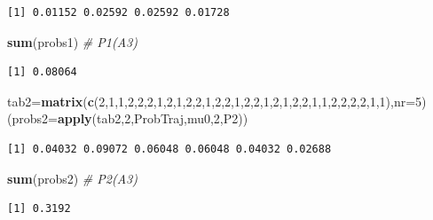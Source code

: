 \documentclass[
]{book}
\newenvironment{Shaded}{\begin{snugshade}}{\end{snugshade}}
\newcommand{\CommentTok}[1]{\textcolor[rgb]{0.56,0.35,0.01}{\textit{#1}}}
\newcommand{\DataTypeTok}[1]{\textcolor[rgb]{0.13,0.29,0.53}{#1}}
\newcommand{\DecValTok}[1]{\textcolor[rgb]{0.00,0.00,0.81}{#1}}
\newcommand{\KeywordTok}[1]{\textcolor[rgb]{0.13,0.29,0.53}{\textbf{#1}}}
\newcommand{\NormalTok}[1]{#1}
\theoremstyle{definition}
\theoremstyle{definition}
\theoremstyle{definition}
\theoremstyle{remark}
\begin{document}
\begin{verbatim}
[1] 0.01152 0.02592 0.02592 0.01728
\end{verbatim}

\begin{Shaded}
\begin{Highlighting}[]
\KeywordTok{sum}\NormalTok{(probs1)    }\CommentTok{# P1(A3)}
\end{Highlighting}
\end{Shaded}

\begin{verbatim}
[1] 0.08064
\end{verbatim}

\begin{Shaded}
\begin{Highlighting}[]
\NormalTok{tab2=}\KeywordTok{matrix}\NormalTok{(}\KeywordTok{c}\NormalTok{(}\DecValTok{2}\NormalTok{,}\DecValTok{1}\NormalTok{,}\DecValTok{1}\NormalTok{,}\DecValTok{2}\NormalTok{,}\DecValTok{2}\NormalTok{,}\DecValTok{2}\NormalTok{,}\DecValTok{1}\NormalTok{,}\DecValTok{2}\NormalTok{,}\DecValTok{1}\NormalTok{,}\DecValTok{2}\NormalTok{,}\DecValTok{2}\NormalTok{,}\DecValTok{1}\NormalTok{,}\DecValTok{2}\NormalTok{,}\DecValTok{2}\NormalTok{,}\DecValTok{1}\NormalTok{,}\DecValTok{2}\NormalTok{,}\DecValTok{2}\NormalTok{,}\DecValTok{1}\NormalTok{,}\DecValTok{2}\NormalTok{,}\DecValTok{1}\NormalTok{,}\DecValTok{2}\NormalTok{,}\DecValTok{2}\NormalTok{,}\DecValTok{1}\NormalTok{,}\DecValTok{1}\NormalTok{,}\DecValTok{2}\NormalTok{,}\DecValTok{2}\NormalTok{,}\DecValTok{2}\NormalTok{,}\DecValTok{2}\NormalTok{,}\DecValTok{1}\NormalTok{,}\DecValTok{1}\NormalTok{),}\DataTypeTok{nr=}\DecValTok{5}\NormalTok{)}
\NormalTok{(}\DataTypeTok{probs2=}\KeywordTok{apply}\NormalTok{(tab2,}\DecValTok{2}\NormalTok{,ProbTraj,mu0,}\DecValTok{2}\NormalTok{,P2))}
\end{Highlighting}
\end{Shaded}

\begin{verbatim}
[1] 0.04032 0.09072 0.06048 0.06048 0.04032 0.02688
\end{verbatim}

\begin{Shaded}
\begin{Highlighting}[]
\KeywordTok{sum}\NormalTok{(probs2)    }\CommentTok{# P2(A3)}
\end{Highlighting}
\end{Shaded}

\begin{verbatim}
[1] 0.3192
\end{verbatim}
\end{document}
